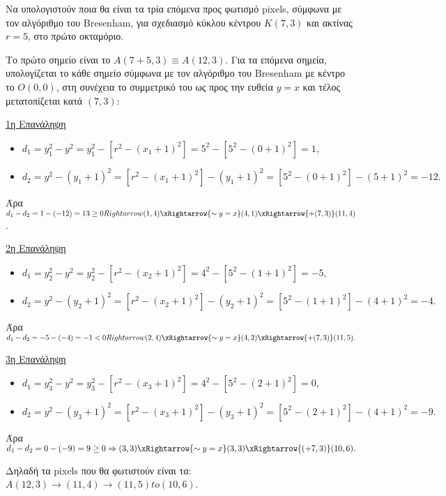 \begin{exercise}
	
Να υπολογιστούν ποια θα είναι τα τρία επόμενα προς φωτισμό pixels, σύμφωνα με τον αλγόριθμο του Bresenham, για σχεδιασμό κύκλου κέντρου $K(7,3)$ και ακτίνας $r = 5$, στο πρώτο οκταμόριο.
\end{exercise}
\begin{solution}
	

Το πρώτο σημείο είναι το $A(7+5, 3) \equiv A(12, 3)$. Για τα επόμενα σημεία, υπολογίζεται το κάθε σημείο σύμφωνα με τον αλγόριθμο του Bresenham με κέντρο το $O(0,0)$, στη συνέχεια το συμμετρικό του ως προς την ευθεία $y=x$ και τέλος μετατοπίζεται κατά $(7,3)$:


\underline{1η Επανάληψη}
\begin{itemize}
  \item $d_1 = y_1^2 - y^2 = y_1^2 - \left[ r^2 - (x_1 + 1)^2 \right] = 5^2 - \left[ 5^2 - (0+1)^2 \right] = 1,$
  \item $d_2 = y^2 - (y_1+1)^2 = \left[ r^2 - (x_1+1)^2 \right] - (y_1+1)^2 = \left[ 5^2 - (0+1)^2 \right] - (5+1)^2 = -12.$
\end{itemize}

Άρα $d_1 - d_2 = 1 - (-12) = 13 \geq 0 \\Rightarrow (1,4) \xRightarrow{\sim y = x} (4,1) \xRightarrow{+(7,3)} (11,4)$.


\underline{2η Επανάληψη}
\begin{itemize}
  \item $d_1 = y_2^2 - y^2 = y_2^2 - \left[ r^2 - (x_2 + 1)^2 \right] = 4^2 - \left[ 5^2 - (1+1)^2 \right] = -5,$
  \item $d_2 = y^2 - (y_2+1)^2 = \left[ r^2 - (x_2+1)^2 \right] - (y_2+1)^2 = \left[ 5^2 - (1+1)^2 \right] - (4+1)^2 = -4.$
\end{itemize}

Άρα $d_1 - d_2 = -5 - (-4) = -1 < 0 \\Rightarrow (2,4) \xRightarrow{\sim y = x} (4,2) \xRightarrow{+(7,3)} (11,5).$

\underline{3η Επανάληψη}
\begin{itemize}
  \item $d_1 = y_3^2 - y^2 = y_3^2 - \left[ r^2 - (x_3 + 1)^2 \right] = 4^2 - \left[ 5^2 - (2+1)^2 \right] = 0,$
  \item $d_2 = y^2 - (y_3+1)^2 = \left[ r^2 - (x_3+1)^2 \right] - (y_3+1)^2 = \left[ 5^2 - (2+1)^2 \right] - (4+1)^2 = -9.$
\end{itemize}

Άρα $d_1 - d_2 = 0 - (-9) = 9 \geq 0 \Rightarrow (3,3)  \xRightarrow{\sim y = x}(3,3) \xRightarrow{(+7,3)} (10,6).$




Δηλαδή τα pixels που θα φωτιστούν είναι τα: \newline $A(12,3) \to (11,4) \to (11,5) to (10,6)$.
\end{solution}